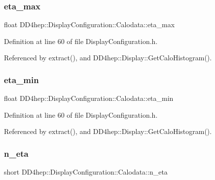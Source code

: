 \subsubsection{\texorpdfstring{eta\+\_\+max}{eta\_max}}
{\footnotesize\ttfamily float D\+D4hep\+::\+Display\+Configuration\+::\+Calodata\+::eta\+\_\+max}



Definition at line 60 of file Display\+Configuration.\+h.



Referenced by extract(), and D\+D4hep\+::\+Display\+::\+Get\+Calo\+Histogram().

\hypertarget{struct_d_d4hep_1_1_display_configuration_1_1_calodata_a9a610caa053f259f21ee4051de9c7160}{}\label{struct_d_d4hep_1_1_display_configuration_1_1_calodata_a9a610caa053f259f21ee4051de9c7160} 
\subsubsection{\texorpdfstring{eta\+\_\+min}{eta\_min}}
{\footnotesize\ttfamily float D\+D4hep\+::\+Display\+Configuration\+::\+Calodata\+::eta\+\_\+min}



Definition at line 60 of file Display\+Configuration.\+h.



Referenced by extract(), and D\+D4hep\+::\+Display\+::\+Get\+Calo\+Histogram().

\hypertarget{struct_d_d4hep_1_1_display_configuration_1_1_calodata_a0f4545d6efc01e1496fafdd925a4bdcd}{}\label{struct_d_d4hep_1_1_display_configuration_1_1_calodata_a0f4545d6efc01e1496fafdd925a4bdcd} 
\subsubsection{\texorpdfstring{n\+\_\+eta}{n\_eta}}
{\footnotesize\ttfamily short D\+D4hep\+::\+Display\+Configuration\+::\+Calodata\+::n\+\_\+eta}




